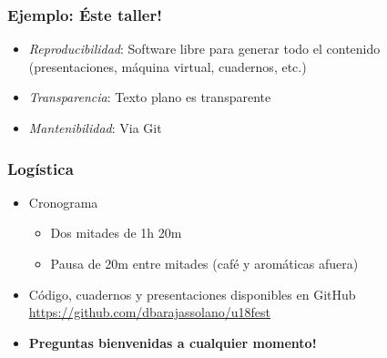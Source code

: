 \documentclass[xcolor=dvipsnames,10pt]{beamer}
\begin{document}
%
\begin{frame}
  \frametitle{Ejemplo: Éste taller!}
  \begin{itemize}
  \item \emph{Reproducibilidad}: Software libre para generar todo el contenido (presentaciones, máquina virtual, cuadernos, etc.)
  \item \emph{Transparencia}: Texto plano es transparente
  \item \emph{Mantenibilidad}: Via \textsf{Git}
  \end{itemize}
\end{frame}
%
\begin{frame}
  \frametitle{Logística}
  \begin{itemize}
  \item Cronograma
    \begin{itemize}
    \item Dos mitades de 1h 20m
    \item Pausa de 20m entre mitades (café y aromáticas afuera)
    \end{itemize}
  \item Código, cuadernos y presentaciones disponibles en \textsf{GitHub}\\
    \url{https://github.com/dbarajassolano/u18fest}
  \item \textbf{Preguntas bienvenidas a cualquier momento!}
  \end{itemize}
\end{frame}
\end{document}
